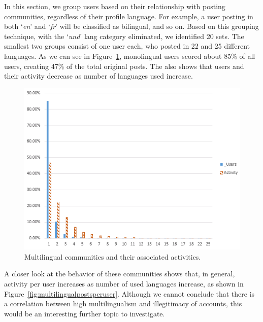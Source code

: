 \documentclass[conference]{IEEEtran}
\begin{document}
In this section, we group users based on their relationship with
posting communities, regardless of their profile language. For
example, a user posting in both `{\emph{en}}' and `{\emph{fr}}' will
be classified as bilingual, and so on. Based on this grouping
technique, with the `{\emph{und}}' lang category eliminated, we
identified 20 sets. The smallest two groups consist of one user each,
who posted in 22 and 25 different languages.  As we can see in
Figure~\ref{fig:multilingual}, monolingual users scored about 85\% of
all users, creating 47\% of the total original posts. The also shows
that users and their activity decrease as number of languages used
increase.


\begin{figure}[!htb]
\centering
\includegraphics[width=\columnwidth]{images/multilingualcommunities.png}
\caption{Multilingual communities and their associated activities.}
\label{fig:multilingual}
\end{figure}


A closer look at the behavior of these communities shows that, in
general, activity per user increases as number of used languages
increase, as shown in
Figure~\ref{fig:multilingualpostsperuser}. Although we cannot conclude
that there is a correlation between high multilingualism and
illegitimacy of accounts, this would be an interesting further topic
to investigate.
\end{document}
